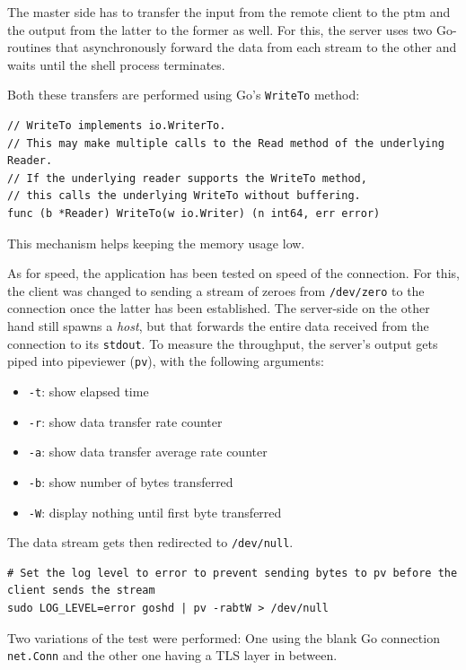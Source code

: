 \documentclass[10pt,a4paper,titlepage,twoside,english,final]{zhawreprt}
\begin{document}
The master side has to transfer the input from the remote client to the \gls{ptm} and the output from the latter to the former as well.
For this, the server uses two \gls{Go}-routines that asynchronously forward the data from each stream to the other and waits until the shell process terminates.

Both these transfers are performed using \gls{Go}'s \texttt{WriteTo} method:
\setlistingGo
\begin{lstlisting}[caption={\texttt{WriteTo} method of \gls{Go}},label=lst:GoWriteTo]
// WriteTo implements io.WriterTo.
// This may make multiple calls to the Read method of the underlying Reader.
// If the underlying reader supports the WriteTo method,
// this calls the underlying WriteTo without buffering.
func (b *Reader) WriteTo(w io.Writer) (n int64, err error)
\end{lstlisting}

This mechanism helps keeping the memory usage low.

As for speed, the application has been tested on speed of the connection.
For this, the client was changed to sending a stream of zeroes from \texttt{/dev/zero} to the connection once the latter has been established.
The server-side on the other hand still spawns a \textit{host}, but that forwards the entire data received from the connection to its \texttt{stdout}.
To measure the throughput, the server's output gets piped into pipeviewer (\texttt{pv}), with the following arguments:
\begin{itemize}
\item \texttt{-t}: show elapsed time
\item \texttt{-r}: show data transfer rate counter
\item \texttt{-a}: show data transfer average rate counter
\item \texttt{-b}: show number of bytes transferred
\item \texttt{-W}: display nothing until first byte transferred
\end{itemize}
The data stream gets then redirected to \texttt{/dev/null}.

\setlistingBash
\begin{lstlisting}[caption={Throughput measurement},label=lst:ThroughputMeasurement]
# Set the log level to error to prevent sending bytes to pv before the client sends the stream
sudo LOG_LEVEL=error goshd | pv -rabtW > /dev/null
\end{lstlisting}

Two variations of the test were performed:
One using the blank \gls{Go} connection \texttt{net.Conn} and the other one having a \gls{TLS} layer in between.
\end{document}
